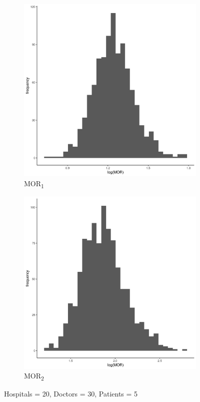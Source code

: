 \documentclass[
  letterpaper,
  DIV=11,
  numbers=noendperiod,
  titlepage]{scrartcl}
\begin{document}
\vspace{10mm}

\begin{figure}
\centering
\begin{subfigure}{.49\textwidth}
    \centering
    \includegraphics[width=.95\linewidth]{../../plots/three-lvl-ran-int/low-prev/hist_20_30_5_three_lvl_low_prev_mor1.png}  
    \caption{MOR\textsubscript{1}}
    \label{l20m30n51}
\end{subfigure}
\begin{subfigure}{.49\textwidth}
    \centering
    \includegraphics[width=.95\linewidth]{../../plots/three-lvl-ran-int/low-prev/hist_20_30_5_three_lvl_low_prev_mor2.png}  
    \caption{MOR\textsubscript{2}}
    \label{l20m30n52}
\end{subfigure}
\caption{Hospitals = 20, Doctors = 30, Patients = 5}
\label{mor1}
\end{figure}
\end{document}
